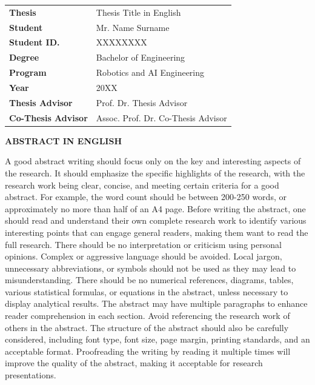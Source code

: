 
\noindent
\begin{tabular}{ll}
\textbf{Thesis} & Thesis Title in English \\
\textbf{Student} & Mr. Name Surname \\
\textbf{Student ID.} & XXXXXXXX \\
\textbf{Degree} & Bachelor of Engineering \\
\textbf{Program} & Robotics and AI Engineering \\
\textbf{Year} & 20XX \\
\textbf{Thesis Advisor} & Prof. Dr. Thesis Advisor \\
\textbf{Co-Thesis Advisor} & Assoc. Prof. Dr. Co-Thesis Advisor \\
\end{tabular}

\vspace{1cm}

\begin{center}
{\fontsize{18pt}{22pt}\selectfont\bfseries ABSTRACT IN ENGLISH}
\end{center}

\vspace{0cm}

A good abstract writing should focus only on the key and interesting aspects of
the research. It should emphasize the specific highlights of the research, with the
research work being clear, concise, and meeting certain criteria for a good abstract. For
example, the word count should be between 200-250 words, or approximately no
more than half of an A4 page. Before writing the abstract, one should read and
understand their own complete research work to identify various interesting points
that can engage general readers, making them want to read the full research. There
should be no interpretation or criticism using personal opinions. Complex or aggressive
language should be avoided. Local jargon, unnecessary abbreviations, or symbols
should not be used as they may lead to misunderstanding. There should be no
numerical references, diagrams, tables, various statistical formulas, or equations in the
abstract, unless necessary to display analytical results.
The abstract may have multiple paragraphs to enhance reader comprehension
in each section. Avoid referencing the research work of others in the abstract. The
structure of the abstract should also be carefully considered, including font type, font
size, page margin, printing standards, and an acceptable format. Proofreading the
writing by reading it multiple times will improve the quality of the abstract, making it
acceptable for research presentations.